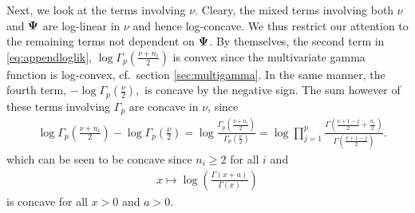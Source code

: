 \documentclass{article}\usepackage[]{graphicx}\usepackage[]{color}
\begin{document}
Next, we look at the terms involving $\nu$.
Cleary, the mixed terms involving both $\nu$ and ${\boldsymbol{\Psi}}$ are log-linear in $\nu$ and hence log-concave.
We thus restrict our attention to the remaining terms not dependent on ${\boldsymbol{\Psi}}$.
By themselves, the second term in \eqref{eq:appendloglik},
$
\log \Gamma_p\!\left(\frac{\nu + n_i}{2}\right)
$
is convex since the multivariate gamma function is log-convex, cf.\ section \ref{sec:multigamma}.
In the same manner, the fourth term,
$
  - \log \Gamma_p\!\left(\frac{\nu}{2}\right),
$
is concave by the negative sign.
The sum however of these terms involving $\Gamma_p$ are concave in $\nu$, since
\begin{align*}
  &\log\Gamma_p\!\left( \frac{\nu + n_i}{2} \right) -
    \log\Gamma_p\!\left( \frac{\nu}{2} \right)
  =  \log\frac{\Gamma_p\!\left( \frac{\nu + n_i}{2} \right)}{
                \Gamma_p\!\left( \frac{\nu}{2}       \right)}
  = \log \prod_{j = 1}^p
    \frac{\Gamma\!\left( \frac{\nu + 1 - j}{2} + \frac{n_i}{2} \right)}{
          \Gamma\!\left( \frac{\nu + 1 - j}{2} \right)}.
\end{align*}
which can be seen to be concave since $n_i \geq 2$ for all $i$ and
\begin{align*}
  x \mapsto \log\left(\frac{\Gamma(x + a)}{\Gamma(x)}\right)
\end{align*}
is concave for all $x>0$ and $a > 0$.
\end{document}
